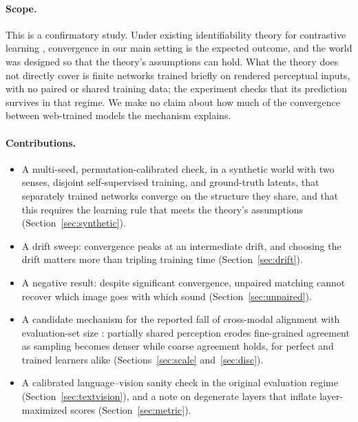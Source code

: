 \documentclass[11pt]{article}
\begin{document}
\paragraph{Scope.} This is a confirmatory study. Under existing identifiability theory for contrastive learning \citep{zimmermann2021contrastive,vonkugelgen2021self,daunhawer2023identifiability}, convergence in our main setting is the expected outcome, and the world was designed so that the theory's assumptions can hold. What the theory does not directly cover is finite networks trained briefly on rendered perceptual inputs, with no paired or shared training data; the experiment checks that its prediction survives in that regime. We make no claim about how much of the convergence between web-trained models the mechanism explains.

\paragraph{Contributions.}
\begin{itemize}
  \item A multi-seed, permutation-calibrated check, in a synthetic world with two senses, disjoint self-supervised training, and ground-truth latents, that separately trained networks converge on the structure they share, and that this requires the learning rule that meets the theory's assumptions (Section~\ref{sec:synthetic}).
  \item A drift sweep: convergence peaks at an intermediate drift, and choosing the drift matters more than tripling training time (Section~\ref{sec:drift}).
  \item A negative result: despite significant convergence, unpaired matching cannot recover which image goes with which sound (Section~\ref{sec:unpaired}).
  \item A candidate mechanism for the reported fall of cross-modal alignment with evaluation-set size \citep{koepke2026cave}: partially shared perception erodes fine-grained agreement as sampling becomes denser while coarse agreement holds, for perfect and trained learners alike (Sections~\ref{sec:scale} and~\ref{sec:disc}).
  \item A calibrated language--vision sanity check in the original evaluation regime (Section~\ref{sec:textvision}), and a note on degenerate layers that inflate layer-maximized scores (Section~\ref{sec:metric}).
\end{itemize}

\end{document}
